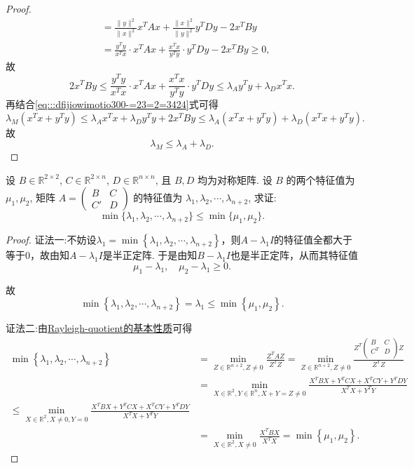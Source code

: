 \documentclass[../../main.tex]{subfiles}
\begin{document}
\begin{proof}
\begin{align*}
&= \frac{\| y \|^2}{\| x \|^2}x^T A x + \frac{\| x \|^2}{\| y \|^2}y^T D y - 2x^T B y \\
&= \frac{y^T y}{x^T x} \cdot x^T A x + \frac{x^T x}{y^T y} \cdot y^T D y - 2x^T B y \geq 0,
\end{align*}
故
$$2x^T B y \leq \frac{y^T y}{x^T x} \cdot x^T A x + \frac{x^T x}{y^T y} \cdot y^T D y \leq \lambda_A y^T y + \lambda_D x^T x.$$
再结合\eqref{eq:::dfijiowimotio300-=23=2=3424}式可得
$$\lambda_M (x^T x + y^T y) \leq \lambda_A x^T x + \lambda_D y^T y + 2x^T B y \leq \lambda_A (x^T x + y^T y) + \lambda_D (x^T x + y^T y).$$
故
$$\lambda_M \leq \lambda_A + \lambda_D.$$

\end{proof}

\begin{example}
设 $B \in \mathbb{R}^{2 \times 2}$, $C \in \mathbb{R}^{2 \times n}$, $D \in \mathbb{R}^{n \times n}$, 且 $B,D$ 均为对称矩阵. 设 $B$ 的两个特征值为 $\mu_1,\mu_2$, 矩阵 $A = \begin{pmatrix} B & C \\ C' & D \end{pmatrix}$ 的特征值为 $\lambda_1,\lambda_2,\cdots,\lambda_{n+2}$, 求证:
$$\min\{\lambda_1,\lambda_2,\cdots,\lambda_{n+2}\} \leq \min\{\mu_1,\mu_2\}.$$
\end{example}
\begin{proof}
{\color{blue}证法一:}不妨设$\lambda_1=\min\left\{ \lambda_1,\lambda_2,\cdots,\lambda_{n+2} \right\}$，则$A-\lambda_1 I$的特征值全都大于等于$0$，故由知$A-\lambda_1 I$是半正定阵.
于是由知$B-\lambda_1 I$也是半正定阵，从而其特征值
$$\mu_1-\lambda_1, \quad \mu_2-\lambda_1 \geqslant 0.$$

故
$$\min\left\{ \lambda_1,\lambda_2,\cdots,\lambda_{n+2} \right\}=\lambda_1 \leqslant \min\left\{ \mu_1,\mu_2 \right\}.$$

{\color{blue}证法二:}由\hyperref[proposition:Rayleigh-quotient瑞丽商的基本性质]{Rayleigh-quotient的基本性质}可得
\begin{align*}
\min \left\{ \lambda _1,\lambda _2,\cdots ,\lambda _{n+2} \right\} &=\underset{Z\in \mathbb{R} ^{n+2},Z\ne 0}{\min}\frac{Z^TAZ}{Z^TZ}=\underset{Z\in \mathbb{R} ^{n+2},Z\ne 0}{\min}\frac{Z^T\left( \begin{matrix}
B&		C\\
C^T&		D\\
\end{matrix} \right) Z}{Z^TZ}
\\
&=\underset{X\in \mathbb{R} ^2,Y\in \mathbb{R} ^n,X+Y=Z\ne 0}{\min}\frac{X^TBX+Y^TCX+X^TCY+Y^TDY}{X^TX+Y^TY}
\\
\leqslant \underset{X\in \mathbb{R} ^2,X\ne 0,Y=0}{\min}\frac{X^TBX+Y^TCX+X^TCY+Y^TDY}{X^TX+Y^TY}
\\
&=\underset{X\in \mathbb{R} ^2,X\ne 0}{\min}\frac{X^TBX}{X^TX}=\min \left\{ \mu _1,\mu _2 \right\} .
\end{align*}

\end{proof}
\end{document}
